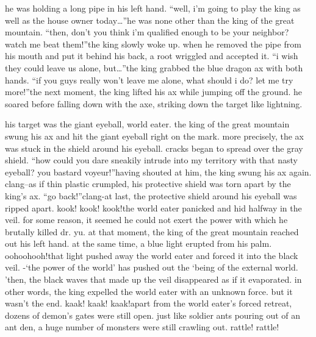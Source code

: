  he was holding a long pipe in his left hand.
“well, i’m going to play the king as well as the house owner today…”he was none other than the king of the great mountain.
“then, don’t you think i’m qualified enough to be your neighbor? watch me beat them!”the king slowly woke up.
 when he removed the pipe from his mouth and put it behind his back, a root wriggled and accepted it.
“i wish they could leave us alone, but…”the king grabbed the blue dragon ax with both hands.
“if you guys really won’t leave me alone, what should i do? let me try more!”the next moment, the king lifted his ax while jumping off the ground.
he soared before falling down with the axe, striking down the target like lightning.


his target was the giant eyeball, world eater.
the king of the great mountain swung his ax and hit the giant eyeball right on the mark.
 more precisely, the ax was stuck in the shield around his eyeball.
 cracks began to spread over the gray shield.
“how could you dare sneakily intrude into my territory with that nasty eyeball? you bastard voyeur!”having shouted at him, the king swung his ax again.
clang–as if thin plastic crumpled, his protective shield was torn apart by the king’s ax.
“go back!”clang-at last, the protective shield around his eyeball was ripped apart.
kook! kook! kook!the world eater panicked and hid halfway in the veil.
 for some reason, it seemed he could not exert the power with which he brutally killed dr.
 yu.
at that moment, the king of the great mountain reached out his left hand.
 at the same time, a blue light erupted from his palm.
oohoohooh!that light pushed away the world eater and forced it into the black veil.
-‘the power of the world’ has pushed out the ‘being of the external world.
’then, the black waves that made up the veil disappeared as if it evaporated.
in other words, the king expelled the world eater with an unknown force.
but it wasn’t the end.
kaak! kaak! kaak!apart from the world eater’s forced retreat, dozens of demon’s gates were still open.
just like soldier ants pouring out of an ant den, a huge number of monsters were still crawling out.
rattle! rattle!

 